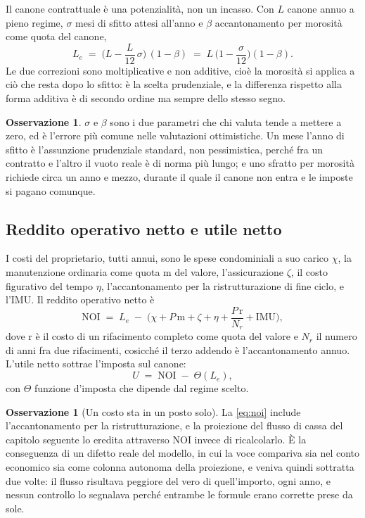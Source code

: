 \documentclass[11pt,a4paper]{article}
\theoremstyle{definition}
\newtheorem{osservazione}[definizione]{Osservazione}
\theoremstyle{plain}
\begin{document}
Il canone contrattuale è una potenzialità, non un incasso. Con $L$ canone annuo a pieno regime, $\sigma$ mesi di sfitto attesi all'anno e $\beta$ accantonamento per morosità come quota del canone,
\begin{equation}
L_e \;=\; \Big(L - \frac{L}{12}\,\sigma\Big)\,(1-\beta)
\;=\; L\,\Big(1-\frac{\sigma}{12}\Big)(1-\beta).
\label{eq:ricavo-effettivo}
\end{equation}
Le due correzioni sono moltiplicative e non additive, cioè la morosità si applica a ciò che resta dopo lo sfitto: è la scelta prudenziale, e la differenza rispetto alla forma additiva è di secondo ordine ma sempre dello stesso segno.

\begin{osservazione}
$\sigma$ e $\beta$ sono i due parametri che chi valuta tende a mettere a zero, ed è l'errore più comune nelle valutazioni ottimistiche. Un mese l'anno di sfitto è l'assunzione prudenziale standard, non pessimistica, perché fra un contratto e l'altro il vuoto reale è di norma più lungo; e uno sfratto per morosità richiede circa un anno e mezzo, durante il quale il canone non entra e le imposte si pagano comunque.
\end{osservazione}

\subsection{Reddito operativo netto e utile netto}

I costi del proprietario, tutti annui, sono le spese condominiali a suo carico $\chi$, la manutenzione ordinaria come quota $\mathrm{m}$ del valore, l'assicurazione $\zeta$, il costo figurativo del tempo $\eta$, l'accantonamento per la ristrutturazione di fine ciclo, e l'IMU. Il reddito operativo netto è
\begin{equation}
\mathrm{NOI} \;=\; L_e \;-\; \Big(\chi + P\,\mathrm{m} + \zeta + \eta + \frac{P\,\mathrm{r}}{N_r} + \mathrm{IMU}\Big),
\label{eq:noi}
\end{equation}
dove $\mathrm{r}$ è il costo di un rifacimento completo come quota del valore e $N_r$ il numero di anni fra due rifacimenti, cosicché il terzo addendo è l'accantonamento annuo. L'utile netto sottrae l'imposta sul canone:
\begin{equation}
U \;=\; \mathrm{NOI} \;-\; \Theta(L_e),
\label{eq:utile}
\end{equation}
con $\Theta$ funzione d'imposta che dipende dal regime scelto.

\begin{osservazione}[Un costo sta in un posto solo]
La \eqref{eq:noi} include l'accantonamento per la ristrutturazione, e la proiezione del flusso di cassa del capitolo seguente lo eredita attraverso $\mathrm{NOI}$ invece di ricalcolarlo. È la conseguenza di un difetto reale del modello, in cui la voce compariva sia nel conto economico sia come colonna autonoma della proiezione, e veniva quindi sottratta due volte: il flusso risultava peggiore del vero di quell'importo, ogni anno, e nessun controllo lo segnalava perché entrambe le formule erano corrette prese da sole.
\end{osservazione}
\end{document}

